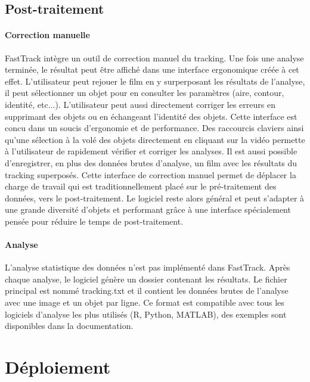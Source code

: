 		\subsection{Post-traitement}
		
		\paragraph{Correction manuelle}
		FastTrack intègre un outil de correction manuel du tracking. Une fois une analyse terminée, le résultat peut être affiché dans une interface ergonomique créée à cet effet. L'utilisateur peut rejouer le film en y surperposant les résultats de l'analyse, il peut sélectionner un objet pour en consulter les paramètres (aire, contour, identité, etc...). L'utilisateur peut aussi directement corriger les erreurs en supprimant des objets ou en échangeant l'identité des objets. Cette interface est concu dans un soucis d'ergonomie et de performance. Des raccourcis claviers ainsi qu'une sélection à la volé des objets directement en cliquant sur la vidéo permette à l'utilisateur de rapidement vérifier et corriger les analyses. Il est aussi possible d'enregistrer, en plus des données brutes d'analyse, un film avec les résultats du tracking superposés.
		Cette interface de correction manuel permet de déplacer la charge de travail qui est traditionnellement placé sur le pré-traitement des données, vers le post-traitement. Le logiciel reste alors général et peut s'adapter à une grande diversité d'objets et performant grâce à une interface spécialement pensée pour réduire le temps de post-traitement.
		
		\paragraph{Analyse}
		L'analyse statistique des données n'est pas implémenté dans FastTrack. Après chaque analyse, le logiciel génère un dossier contenant les résultats. Le fichier principal est nommé tracking.txt et il contient les données brutes de l'analyse avec une image et un objet par ligne. Ce format est compatible avec tous les logiciels d'analyse les plus utilisés (R, Python, MATLAB), des exemples sont disponibles dans la documentation.
		
	\section{Déploiement}
